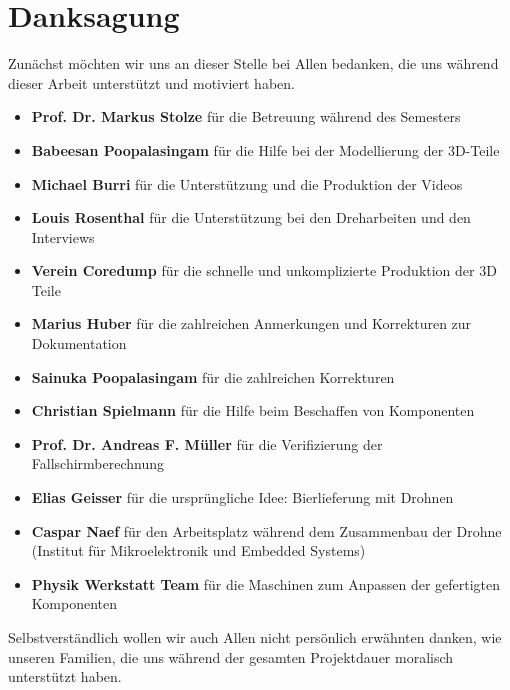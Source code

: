 \newpage
\cleardoublepage
{}
{}
\chapter*{Danksagung}
Zunächst möchten wir uns an dieser Stelle bei Allen bedanken, die uns während dieser Arbeit unterstützt und motiviert haben.
\begin{itemize}
	\item{\textbf{Prof. Dr. Markus Stolze} für die Betreuung während des Semesters}
	\item{\textbf{Babeesan Poopalasingam} für die Hilfe bei der Modellierung der 3D-Teile}
	\item{\textbf{Michael Burri} für die Unterstützung und die Produktion der Videos}
	\item{\textbf{Louis Rosenthal} für die Unterstützung bei den Dreharbeiten und den Interviews}
	\item{\textbf{Verein Coredump} für die schnelle und unkomplizierte Produktion der 3D Teile}
	\item{\textbf{Marius Huber} für die zahlreichen Anmerkungen und Korrekturen zur Dokumentation}
	\item{\textbf{Sainuka Poopalasingam} für die zahlreichen Korrekturen}
    \item{\textbf{Christian Spielmann} für die Hilfe beim Beschaffen von Komponenten}
	\item{\textbf{Prof. Dr. Andreas F. Müller} für die Verifizierung der Fallschirmberechnung}
	\item{\textbf{Elias Geisser} für die ursprüngliche Idee: Bierlieferung mit Drohnen}
	\item{\textbf{Caspar Naef} für den Arbeitsplatz während dem Zusammenbau der Drohne (Institut für Mikroelektronik und Embedded Systems) }
	\item{\textbf{Physik Werkstatt Team} für die Maschinen zum Anpassen der gefertigten Komponenten}
\end{itemize}
Selbstverständlich wollen wir auch Allen nicht persönlich erwähnten danken, wie unseren Familien, die uns während der gesamten Projektdauer moralisch unterstützt haben.